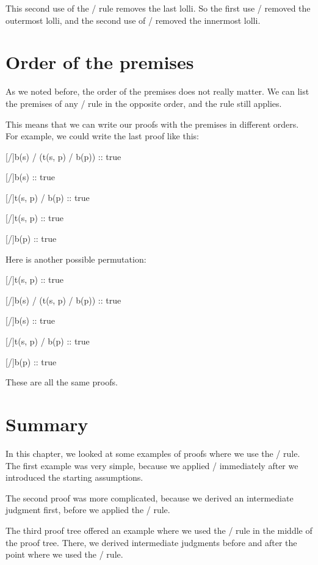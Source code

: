 \documentclass[../../../main.tex]{subfiles}
\begin{document}
\noindent
This second use of the \lolliElim/ rule removes the last lolli. So the first use \lolliElim/ removed the outermost lolli, and the second use of \lolliElim/ removed the innermost lolli.


\section{Order of the premises}

As we noted before, the order of the premises does not really matter. We can list the premises of any \lolliElim/ rule in the opposite order, and the rule still applies. 

This means that we can write our proofs with the premises in different orders. For example, we could write the last proof like this:

\begin{prooftree*}
  \hypo{}
  [\startrule/]{b(s) \lolli/ (t(s, p) \lolli/ b(p)) :: true}  

  \hypo{}
  [\startrule/]{b(s) :: true}

  [\lolliElim/]{t(s, p) \lolli/ b(p) :: true}

  \hypo{}
  [\startrule/]{t(s, p) :: true}

  [\lolliElim/]{b(p) :: true}
\end{prooftree*}
 
\noindent
Here is another possible permutation:

\begin{prooftree*}
  \hypo{}
  [\startrule/]{t(s, p) :: true}

  \hypo{}
  [\startrule/]{b(s) \lolli/ (t(s, p) \lolli/ b(p)) :: true}  

  \hypo{}
  [\startrule/]{b(s) :: true}

  [\lolliElim/]{t(s, p) \lolli/ b(p) :: true}

  [\lolliElim/]{b(p) :: true}
\end{prooftree*}

\noindent
These are all the same proofs.


\section{Summary}

In this chapter, we looked at some examples of proofs where we use the \lolliElim/ rule. The first example was very simple, because we applied \lolliElim/ immediately after we introduced the starting assumptions. 

The second proof was more complicated, because we derived an intermediate judgment first, before we applied the \lolliElim/ rule.

The third proof tree offered an example where we used the \lolliElim/ rule in the middle of the proof tree. There, we derived intermediate judgments before and after the point where we used the \lolliElim/ rule.
\end{document}
